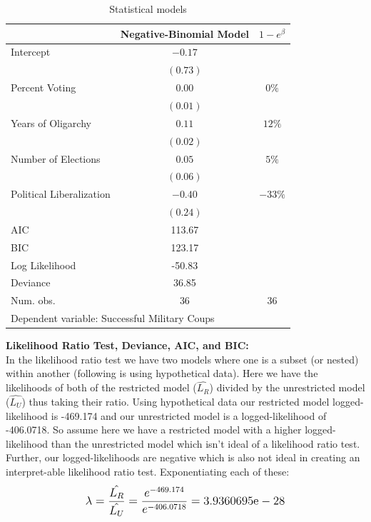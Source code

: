 \documentclass[12pt]{article}\usepackage[]{graphicx}\usepackage[]{color}
\begin{document}
\begin{flushleft}
\begin{table}[h!]
\caption{Statistical models}
\begin{center}
\begin{tabular}{l c c }
\hline
 & Negative-Binomial Model & $1- e^\beta$  \\
\hline
Intercept                 & $-0.17$    & \\
                          & $(0.73)$   & \\
Percent Voting            & $0.00$     & $0\%$ \\
                          & $(0.01)$   &\\
Years of Oligarchy        & $0.11$     & $12\%$ \\
                          & $(0.02)$   &\\
Number of Elections       & $0.05$     & $5\% $ \\
                          & $(0.06)$   &\\
Political Liberalization  & $-0.40$    & $-33\%$\\
                          & $(0.24)$   &\\
\hline
AIC                       & 113.67     &\\
BIC                       & 123.17     &\\
Log Likelihood            & -50.83     &\\
Deviance                  & 36.85      &\\
Num. obs.                 & 36         & 36\\
\hline
\multicolumn{3}{l}{\scriptsize{Dependent variable: Successful Military Coups}}
\end{tabular}
\end{center}
\end{table}


\noindent \textbf{Likelihood Ratio Test, Deviance, AIC, and BIC:}\\
In the likelihood ratio test we have two models where one is a subset (or nested) within another (following is using hypothetical data). Here we have the likelihoods of both of the restricted model ($\hat{L_R}$) divided by the unrestricted model ($\hat{L_U}$) thus taking their ratio. Using hypothetical data our restricted model logged-likelihood is -469.174 and our unrestricted model is a logged-likelihood of -406.0718. So assume here we have a restricted model with a higher logged-likelihood than the unrestricted model which isn't ideal of a likelihood ratio test. Further, our logged-likelihoods are negative which is also not ideal in creating an interpret-able likelihood ratio test. Exponentiating each of these:\\
\begin{equation}
\mathlarger{ \lambda = \frac{ \hat{L_R}}{ \hat{L_U}} = \frac{ e^{-469.174}}{e^{-406.0718}} = 3.9360695\text{e}-28 }
\end{equation}


\end{flushleft}
\end{document}

